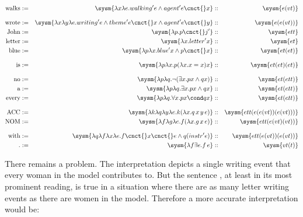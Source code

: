 \documentclass[10pt,a4paper]{exam}
\begin{document}
\begin{questions}
\begin{solution}
\begin{ulexicon}
\begin{align*}
	\text{walks}   &:=& \sysm{\lambda x\lambda e.walking'e \land agent'e\cnct{}x}  &::& \sysm{e(vt)}\\[8pt]
	\text{wrote}  &:=& \sysm{\lambda x\lambda y\lambda e.writing' e \land theme'e\cnct{} x \land agent'e\cnct{} y}   &::& \sysm{e(e(vt))}\\
	\text{John}    &:=& \sysm{\lambda p.p\cnct{}j'}                      &::& \sysm{ett}\\
	\text{letter}   &:=& \sysm{\lambda x.letter'x}                          &::& \sysm{et}\\
	\text{blue}    &:=& \sysm{\lambda p\lambda x.blue'x\land p\cnct{}x}  &::& \sysm{et(et)}\\[8pt]
	\text{is}      &:=& \sysm{\lambda p\lambda x.p (\lambda x.x=x) x}    &::& \sysm{et(et)(et)}\\[8pt]
	\text{no}      &:=& \sysm{\lambda p\lambda q.\neg(\exists x. px \land qx)} &::& \sysm{et(ett)}\\
	\text{a}       &:=& \sysm{\lambda p\lambda q.\exists x. px \land qx} &::& \sysm{et(ett)}\\
	\text{every}   &:=& \sysm{\lambda p\lambda q.\forall x. px \cond qx} &::& \sysm{et(ett)}\\[8pt]
	\text{ACC}     &:=& \sysm{\lambda k \lambda q \lambda y \lambda e . k (\lambda x . q\, x\, y\, e)
} &::& \sysm{ett(e(e(vt))(e(vt)))}\\
	\text{NOM}     &:=& \sysm{\lambda f\lambda g\lambda e . f
	(\lambda x . g\, x\, e)} &::& \sysm{ett(e(vt)(vt))}\\[8pt]
	\text{with}     &:=& \sysm{\lambda q\lambda f\lambda x\lambda e . f\cnct{}x\cnct{}e \land q (instr' e)} &::& \sysm{ett(e(vt))(e(vt))}\\
	\text{.}    &:=& \sysm{\lambda f \exists e.f\, e} &::& \sysm{vt(t)}\\
\end{align*}

\end{ulexicon}

\end{solution}


\question[50] There remains a problem. The interpretation
 depicts a single writing event that every woman in
the model contributes to. But the sentence , at least
in its most prominent reading, is true in a situation where there are
as many letter writing events as there are women in the model.
Therefore a more accurate interpretation would be:



\end{questions}
\end{document}
